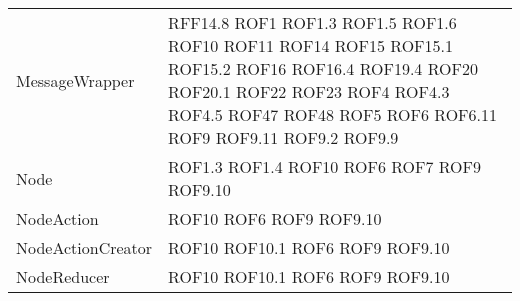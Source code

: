 \begin{longtable}{p{5cm}!{\VRule[1pt]}p{2.5cm}}
		MessageWrapper & RFF14.8 \newline ROF1 \newline ROF1.3 \newline ROF1.5 \newline ROF1.6 \newline ROF10 \newline ROF11 \newline ROF14 \newline ROF15 \newline ROF15.1 \newline ROF15.2 \newline ROF16 \newline ROF16.4 \newline ROF19.4 \newline ROF20 \newline ROF20.1 \newline ROF22 \newline ROF23 \newline ROF4 \newline ROF4.3 \newline ROF4.5 \newline ROF47 \newline ROF48 \newline ROF5 \newline ROF6 \newline ROF6.11 \newline ROF9 \newline ROF9.11 \newline ROF9.2 \newline ROF9.9\\
		Node & ROF1.3 \newline ROF1.4 \newline ROF10 \newline ROF6 \newline ROF7 \newline ROF9 \newline ROF9.10\\
		NodeAction & ROF10 \newline ROF6 \newline ROF9 \newline ROF9.10\\
		NodeActionCreator & ROF10 \newline ROF10.1 \newline ROF6 \newline ROF9 \newline ROF9.10\\
		NodeReducer & ROF10 \newline ROF10.1 \newline ROF6 \newline ROF9 \newline ROF9.10\\

\end{longtable}
